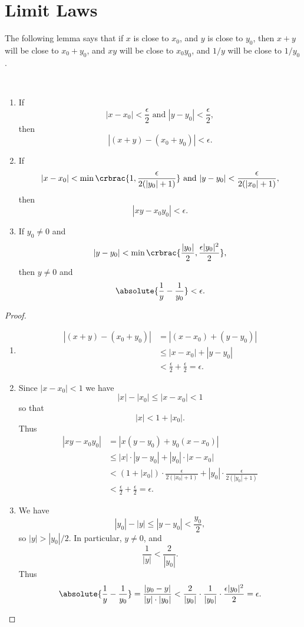 \section{Limit Laws}
The following lemma says that if $x$ is close to $x_0$, and $y$ is close to $y_0$, then $x+y$ will be close to $x_0+y_0$, and $xy$ will be close to $x_0y_0$, and $1/y$ will be close to $1/y_0$.

\begin{lemma} \
\begin{enumerate}[label=(\arabic*)]
\item If 
\[|x-x_0|<\frac{\epsilon}{2}\text{ and }|y-y_0|<\frac{\epsilon}{2},\]
then
\[|(x+y)-(x_0+y_0)|<\epsilon.\]
\item If
\[|x-x_0|<\min\crbrac{1,\frac{\epsilon}{2(|y_0|+1)}}\text{ and }|y-y_0|<\frac{\epsilon}{2(|x_0|+1)},\]
then
\[|xy-x_0y_0|<\epsilon.\]
\item If $y_0\neq0$ and
\[|y-y_0|<\min\crbrac{\frac{|y_0|}{2},\frac{\epsilon|y_0|^2}{2}},\]
then $y\neq0$ and
\[\absolute{\frac{1}{y}-\frac{1}{y_0}}<\epsilon.\]
\end{enumerate}
\end{lemma}

\begin{proof} \
\begin{enumerate}[label=(\arabic*)]
\item \begin{align*}
|(x+y)-(x_0+y_0)|
&=|(x-x_0)+(y-y_0)|\\
&\le|x-x_0|+|y-y_0|\\
&<\frac{\epsilon}{2}+\frac{\epsilon}{2}=\epsilon.
\end{align*}

\item Since $|x-x_0|<1$ we have
\[|x|-|x_0|\le|x-x_0|<1\]
so that
\[|x|<1+|x_0|.\]
Thus
\begin{align*}
|xy-x_0y_0|
&=|x(y-y_0)+y_0(x-x_0)|\\
&\le|x|\cdot|y-y_0|+|y_0|\cdot|x-x_0|\\
&<(1+|x_0|)\cdot\frac{\epsilon}{2(|x_0|+1)}+|y_0|\cdot\frac{\epsilon}{2(|y_0|+1)}\\
&<\frac{\epsilon}{2}+\frac{\epsilon}{2}=\epsilon.
\end{align*}

\item We have
\[|y_0|-|y|\le|y-y_0|<\frac{y_0}{2},\]
so $|y|>|y_0|/2$. In particular, $y\neq0$, and
\[\frac{1}{|y|}<\frac{2}{|y_0|}.\]
Thus
\[\absolute{\frac{1}{y}-\frac{1}{y_0}}=\frac{|y_0-y|}{|y|\cdot|y_0|}<\frac{2}{|y_0|}\cdot\frac{1}{|y_0|}\cdot\frac{\epsilon|y_0|^2}{2}=\epsilon.\]
\end{enumerate}
\end{proof}

